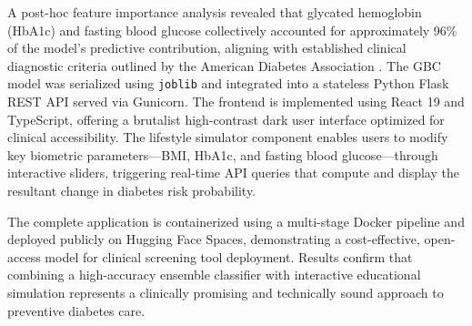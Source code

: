\documentclass[12pt,a4paper]{report}
\begin{document}
A post-hoc feature importance analysis revealed that glycated hemoglobin (HbA1c) and fasting blood glucose collectively accounted for approximately 96\% of the model's predictive contribution, aligning with established clinical diagnostic criteria outlined by the American Diabetes Association \cite{ada_standards_2023}. The GBC model was serialized using \texttt{joblib} and integrated into a stateless Python Flask REST API served via Gunicorn. The frontend is implemented using React 19 and TypeScript, offering a brutalist high-contrast dark user interface optimized for clinical accessibility. The lifestyle simulator component enables users to modify key biometric parameters---BMI, HbA1c, and fasting blood glucose---through interactive sliders, triggering real-time API queries that compute and display the resultant change in diabetes risk probability.

The complete application is containerized using a multi-stage Docker pipeline and deployed publicly on Hugging Face Spaces, demonstrating a cost-effective, open-access model for clinical screening tool deployment. Results confirm that combining a high-accuracy ensemble classifier with interactive educational simulation represents a clinically promising and technically sound approach to preventive diabetes care.

\clearpage

\tableofcontents
\clearpage
\listoffigures
\clearpage
\listoftables
\clearpage

\end{document}
